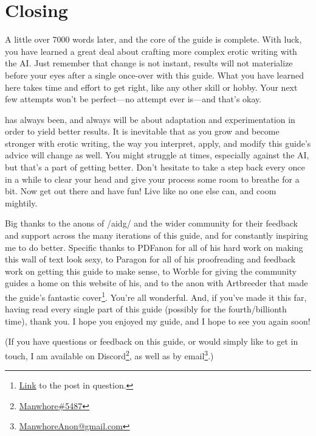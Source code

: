 ﻿\documentclass[Coomer-main.tex]{subfiles}
\begin{document}
\begin{enumerate}
\end{enumerate}

\chapter{Closing}

 A little over 7000 words later, and the core of the guide is complete.
With luck, you have learned a great deal about crafting more complex erotic writing with the AI.
Just remember that change is not instant, results will not materialize before your eyes after a single once-over with this guide.
What you have learned here takes time and effort to get right, like any other skill or hobby.
Your next few attempts won't be perfect—no attempt ever is—and that's okay.

\aid has always been, and always will be about adaptation and experimentation in order to yield better results.
It is inevitable that as you grow and become stronger with erotic writing, the way you interpret, apply, and modify this guide's advice will change as well.
You might struggle at times, especially against the AI, but that's a part of getting better.
Don't hesitate to take a step back every once in a while to clear your head and give your process some room to breathe for a bit.
Now get out there and have fun!
Live like no one else can, and coom mightily.

Big thanks to the anons of /aidg/ and the wider \aid community for their feedback and support across the many iterations of this guide, and for constantly inspiring me to do better.
Specific thanks to PDFanon for all of his hard work on making this wall of text look sexy, to Paragon for all of his proofreading and feedback work on getting this guide to make sense, to Worble for giving the community guides a home on this website of his, and to the anon with Artbreeder that made the guide’s fantastic cover\footnote{\href{https://arch.b4k.co/vg/thread/313360917/\#q313434592}{Link} to the post in question.}.
You're all wonderful.
And, if you've made it this far, having read every single part of this guide (possibly for the fourth/billionth time), thank you.
I hope you enjoyed my guide, and I hope to see you again soon!
\bigskip

(If you have questions or feedback on this guide, or would simply like to get in touch, I am available on Discord\footnote{\href{https://discordapp.com/users/773014944718389248}{Manwhore\#5487}}, as well as by email\footnote{\href{mailto:ManwhoreAnon@gmail.com}{ManwhoreAnon@gmail.com}}.)
\end{document}

